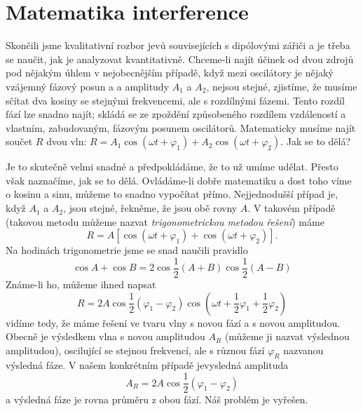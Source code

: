 {  \section{Matematika interference}\label{fyz:IchapXXIXsecV}
    Skončili jsme kvalitativní rozbor jevů souvisejících s dipólovými zářiči a je třeba se naučit, 
    jak je analyzovat kvantitativně. Chceme-li najít účinek od dvou zdrojů pod nějakým úhlem v 
    nejobecnějším případě, když mezi oscilátory je nějaký vzájemný fázový posun a a amplitudy 
    \(A_1\) a \(A_2\), nejsou stejné, zjistíme, že musíme sčítat dva kosiny se stejnými 
    frekvencemi, ale s rozdílnými fázemi. Tento rozdíl fází lze snadno najít; skládá se ze zpoždění 
    způsobeného rozdílem vzdáleností a vlastním, zabudovaným, fázovým posunem oscilátorů. 
    Matematicky musíme najít součet \(R\) dvou vln: \(R = A_1\cos(\omega t + \varphi_1) + 
    A_2\cos(\omega t + \varphi_2)\). Jak se to dělá? 
    
    Je to skutečně velmi snadné a předpokládáme, že to už umíme udělat. Přesto však naznačíme, jak 
    se to dělá. Ovládáme-li dobře matematiku a dost toho víme o kosinu a sinu, můžeme to snadno 
    vypočítat přímo. Nejjednodušší případ je, když \(A_1\) a \(A_2\), jsou stejné, řekněme, že jsou 
    obě rovny \(A\). V takovém případě (takovou metodu můžeme nazvat \emph{trigonometrickou metodou 
    řešení}) máme
    \begin{equation}\label{fyz:eq311}
      R = A\left[\cos(\omega t + \varphi_1) + \cos(\omega t + \varphi_2)\right]. 
    \end{equation}
    Na hodinách trigonometrie jsme se snad naučili pravidlo
    \begin{equation}\label{fyz:eq309}
      \cos A + \cos B =2\cos\frac{1}{2}(A + B)\cos\frac{1}{2}(A - B)
    \end{equation}
    Známe-li ho, můžeme ihned napsat
    \begin{equation}\label{fyz:eq310}
      R = 2A\cos\frac{1}{2}(\varphi_1 - \varphi_2)
            \cos\left(\omega t + \frac{1}{2}\varphi_1 + \frac{1}{2}\varphi_2\right)
    \end{equation}
    vidíme tedy, že máme řešení ve tvaru vlny s novou fází a s novou amplitudou. Obecně je 
    výsledkem vlna s novou amplitudou \(A_R\) (můžeme ji nazvat výslednou amplitudou), oscilující 
    se stejnou frekvencí, ale s různou fází \(\varphi_R\) nazvanou výsledná fáze. V našem 
    konkrétním případě jevysledná amplituda
    \begin{equation}\label{fyz:eq312}
      A_R = 2A\cos\frac{1}{2}(\varphi_1 - \varphi_2)
    \end{equation}
    a výsledná fáze je rovna průměru z obou fází. Náš problém je vyřešen.
    
}
